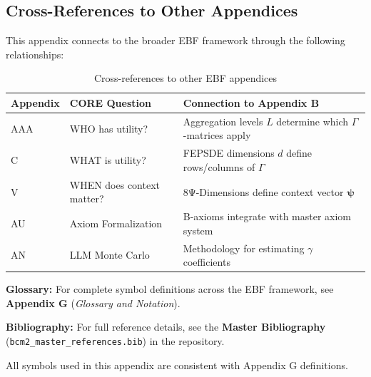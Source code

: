 \subsection{Cross-References to Other Appendices}
\label{sec:B-crossref}

This appendix connects to the broader EBF framework through the following 
relationships:

\begin{table}[h]
\centering
\small
\begin{tabular}{p{2.5cm}p{3cm}p{7cm}}
\toprule
\textbf{Appendix} & \textbf{CORE Question} & \textbf{Connection to Appendix B} \\
\midrule
AAA & WHO has utility? & Aggregation levels $L$ determine which $\Gamma$-matrices apply \\
C & WHAT is utility? & FEPSDE dimensions $d$ define rows/columns of $\Gamma$ \\
V & WHEN does context matter? & 8Ψ-Dimensions define context vector $\boldsymbol{\psi}$ \\
AU & Axiom Formalization & B-axioms integrate with master axiom system \\
AN & LLM Monte Carlo & Methodology for estimating $\gamma$ coefficients \\
\bottomrule
\end{tabular}
\caption{Cross-references to other EBF appendices}
\label{tab:crossref}
\end{table}





\begin{tcolorbox}[colback=blue!5!white, colframe=blue!75!black, 
    title=\textbf{Central References}]

\textbf{Glossary:} For complete symbol definitions across the EBF framework, 
see \textbf{Appendix G} (\textit{Glossary and Notation}).

\textbf{Bibliography:} For full reference details, see the 
\textbf{Master Bibliography} (\texttt{bcm2\_master\_references.bib}) 
in the repository.

All symbols used in this appendix are consistent with Appendix G definitions.

\end{tcolorbox}

